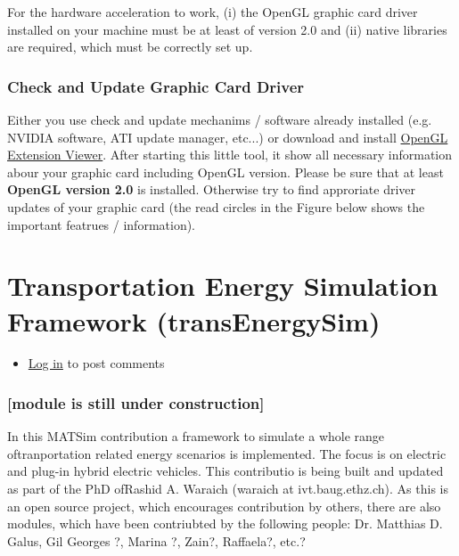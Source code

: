 \documentclass[a4paper,11pt]{report}
\begin{document}
For  the hardware acceleration to work, (i) the OpenGL graphic card driver  installed on your machine must be at least of version 2.0 and (ii)  native libraries are required, which must be correctly set up.

\subsubsection{Check and Update Graphic Card Driver}

Either you use check and update mechanims / software already  installed (e.g. NVIDIA software, ATI update manager, etc...) or download  and install \href{http://www.realtech-vr.com/glview}{OpenGL Extension Viewer}.  After starting this little tool, it show all necessary information  abour your graphic card including OpenGL version. Please be sure that at  least \textbf{OpenGL version 2.0} is installed. Otherwise try  to find approriate driver updates of your graphic card (the read circles  in the Figure below shows the important featrues / information).



\vfill\eject
\section{Transportation Energy Simulation Framework (transEnergySim)}
\begin{itemize}
	\item \href{http://www.matsim.org/user/login?destination=comment/reply/711%23comment-form}{Log in} to post comments
\end{itemize}

\subsubsection{[module is still under construction]}

In this MATSim contribution a framework to simulate a whole range  oftranportation related energy scenarios is implemented. The focus  is on electric and plug-in hybrid electric vehicles. This contributio  is being built and updated as part of the PhD ofRashid A. Waraich  (waraich at ivt.baug.ethz.ch). As this is an open source project, which  encourages contribution by others, there are also modules, which have  been contriubted by the following people: Dr. Matthias D. Galus, Gil  Georges ?, Marina ?, Zain?, Raffaela?, etc.?
\end{document}
